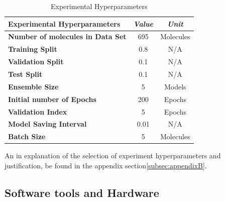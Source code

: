 \begin{table}[H]
    \centering
    \caption{Experimental Hyperparameters}
    \label{tab:experiment}
    \begin{tabular}{|l|c|c|}
        \hline
        \textbf{Experimental Hyperparameters}                          & \multicolumn{1}{l|}{\textit{\textbf{Value}}} & \textit{\textbf{Unit}} \\ \hline
        \multicolumn{1}{|c|}{\textbf{Number of molecules in Data Set}} & 695                                          & Molecules              \\ \hline
        \textbf{Training Split}                                        & 0.8                                          & N/A                    \\ \hline
        \textbf{Validation Split}                                      & 0.1                                          & N/A                    \\ \hline
        \textbf{Test Split}                                            & 0.1                                          & N/A                    \\ \hline
        \textbf{Ensemble Size}                                         & 5                                            & Models                 \\ \hline
        \textbf{Initial number of Epochs}                              & 200                                          & Epochs                 \\ \hline
        \textbf{Validation Index}                                      & 5                                            & Epochs                 \\ \hline
        \textbf{Model Saving Interval}                                 & 0.01                                         & N/A                    \\ \hline
        \textbf{Batch Size}                                            & 5                                            & Molecules              \\ \hline
    \end{tabular}
\end{table}

An in explanation of the selection of experiment hyperparameters and justification,
be found in the appendix section\ref{subsec:appendixB}.

\subsection{Software tools and Hardware}\label{subsec:software}

